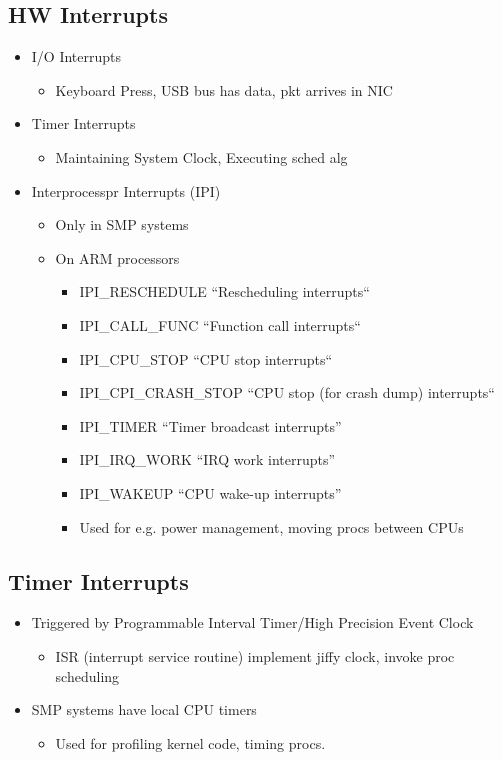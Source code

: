 \subsection{HW Interrupts}

\begin{itemize}
	\item I/O Interrupts
	\begin{itemize}
		\item Keyboard Press, USB bus has data, pkt arrives in NIC
	\end{itemize}
	\item Timer Interrupts
	\begin{itemize}
		\item Maintaining System Clock, Executing sched alg
	\end{itemize}
	\item Interprocesspr Interrupts (IPI)
	\begin{itemize}
		\item Only in SMP systems
		\item On ARM processors
		\begin{itemize}
			\item IPI\_RESCHEDULE ``Rescheduling interrupts``
			\item IPI\_CALL\_FUNC ``Function call interrupts``
			\item IPI\_CPU\_STOP ``CPU stop interrupts``
			\item IPI\_CPI\_CRASH\_STOP ``CPU stop (for crash dump)
				interrupts``
			\item IPI\_TIMER ``Timer broadcast interrupts''
			\item IPI\_IRQ\_WORK ``IRQ work interrupts''
			\item IPI\_WAKEUP ``CPU wake-up interrupts''
			\item Used for e.g. power management, moving procs
				between CPUs
		\end{itemize}
	\end{itemize}
\end{itemize}

\subsection{Timer Interrupts}

\begin{itemize}
	\item Triggered by Programmable Interval Timer/High Precision Event
		Clock
	\begin{itemize}
		\item ISR (interrupt service routine) implement jiffy clock,
			invoke proc scheduling
	\end{itemize}
	\item SMP systems have local CPU timers
	\begin{itemize}
		\item Used for profiling kernel code, timing procs.
	\end{itemize}
\end{itemize}
